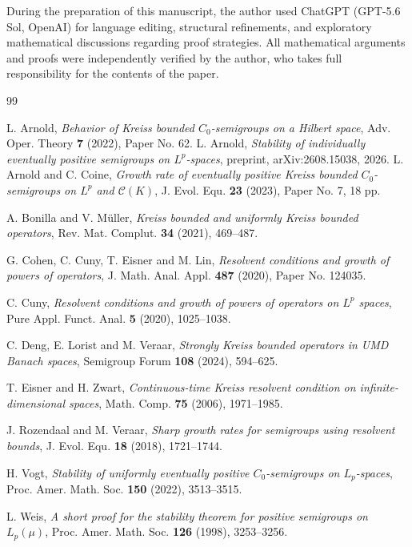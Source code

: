 \documentclass[12pt]{amsart}
\theoremstyle{plain}
\theoremstyle{remark}
\theoremstyle{definition}
\begin{document}
	During the preparation of this manuscript, the author used ChatGPT (GPT-5.6 Sol, OpenAI) for language editing, structural refinements, and exploratory mathematical discussions regarding proof strategies. All mathematical arguments and proofs were independently verified by the author, who takes full responsibility for the contents of the paper.
	\begin{thebibliography}{99}
		
		L. Arnold,
		\textit{Behavior of Kreiss bounded $C_0$-semigroups on a Hilbert space},
		Adv. Oper. Theory \textbf{7} (2022), Paper No. 62.
		L. Arnold,
		\emph{Stability of individually eventually positive semigroups on
			$L^p$-spaces},
		preprint, arXiv:2608.15038, 2026.
		L. Arnold and C. Coine,
		\textit{Growth rate of eventually positive Kreiss bounded $C_0$-semigroups
			on $L^p$ and $\mathcal C(K)$},
		J. Evol. Equ. \textbf{23} (2023), Paper No. 7, 18 pp.
		
		A. Bonilla and V. M\"uller,
		\textit{Kreiss bounded and uniformly Kreiss bounded operators},
		Rev. Mat. Complut. \textbf{34} (2021), 469--487.
		
		G. Cohen, C. Cuny, T. Eisner and M. Lin,
		\textit{Resolvent conditions and growth of powers of operators},
		J. Math. Anal. Appl. \textbf{487} (2020), Paper No. 124035.
		
		C. Cuny,
		\textit{Resolvent conditions and growth of powers of operators on $L^p$ spaces},
		Pure Appl. Funct. Anal. \textbf{5} (2020), 1025--1038.
		
		C. Deng, E. Lorist and M. Veraar,
		\textit{Strongly Kreiss bounded operators in UMD Banach spaces},
		Semigroup Forum \textbf{108} (2024), 594--625.
		
		T. Eisner and H. Zwart,
		\textit{Continuous-time Kreiss resolvent condition on infinite-dimensional
			spaces},
		Math. Comp. \textbf{75} (2006), 1971--1985.
		
		J. Rozendaal and M. Veraar,
		\textit{Sharp growth rates for semigroups using resolvent bounds},
		J. Evol. Equ. \textbf{18} (2018), 1721--1744.
		
		H. Vogt,
		\textit{Stability of uniformly eventually positive $C_0$-semigroups on
			$L_p$-spaces},
		Proc. Amer. Math. Soc. \textbf{150} (2022), 3513--3515.
		
		L. Weis,
		\textit{A short proof for the stability theorem for positive semigroups on
			$L_p(\mu)$},
		Proc. Amer. Math. Soc. \textbf{126} (1998), 3253--3256.
		
	\end{thebibliography}
	
\end{document}
